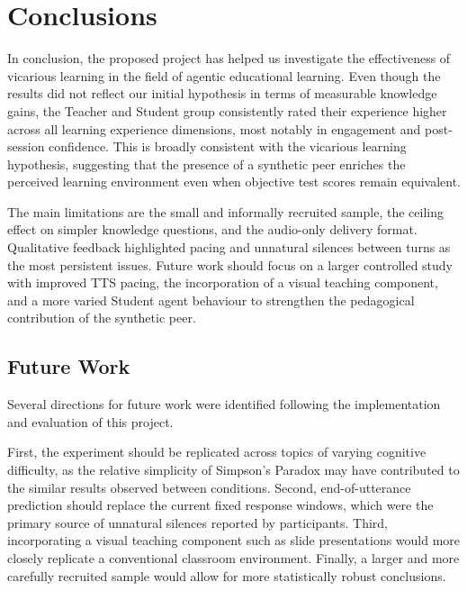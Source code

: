 \section{Conclusions}

In conclusion, the proposed project has helped us investigate the effectiveness of vicarious learning in the field of agentic educational learning. Even though the results did not reflect our initial hypothesis in terms of measurable knowledge gains, the Teacher and Student group consistently rated their experience higher across all learning experience dimensions, most notably in engagement and post-session confidence. This is broadly consistent with the vicarious learning hypothesis, suggesting that the presence of a synthetic peer enriches the perceived learning environment even when objective test scores remain equivalent.

The main limitations are the small and informally recruited sample, the ceiling effect on simpler knowledge questions, and the audio-only delivery format. Qualitative feedback highlighted pacing and unnatural silences between turns as the most persistent issues. Future work should focus on a larger controlled study with improved TTS pacing, the incorporation of a visual teaching component, and a more varied Student agent behaviour to strengthen the pedagogical contribution of the synthetic peer.

\subsection{Future Work}

Several directions for future work were identified following the implementation and evaluation of this project.

First, the experiment should be replicated across topics of varying cognitive difficulty, as the relative simplicity of Simpson's Paradox may have contributed to the similar results observed between conditions. Second, end-of-utterance prediction should replace the current fixed response windows, which were the primary source of unnatural silences reported by participants. Third, incorporating a visual teaching component such as slide presentations would more closely replicate a conventional classroom environment. Finally, a larger and more carefully recruited sample would allow for more statistically robust conclusions.
